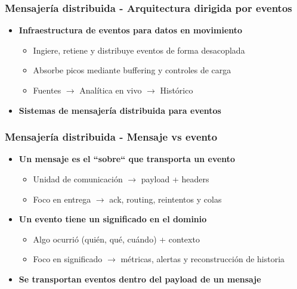 \documentclass[aspectratio=169]{beamer}
\begin{document}
\begin{frame}
\frametitle{Mensajería distribuida - Arquitectura dirigida por eventos}
\begin{itemize}
  \item \textbf{Infraestructura de eventos para datos en movimiento}
  \begin{itemize}
    \item Ingiere, retiene y distribuye eventos de forma desacoplada
    \item Absorbe picos mediante buffering y controles de carga
    \item Fuentes $\rightarrow$ Analítica en vivo $\rightarrow$ Histórico
  \end{itemize}

  \vspace{1em}

  \item \textbf{Sistemas de mensajería distribuida para eventos}
\end{itemize}
\end{frame}


\begin{frame}
\frametitle{Mensajería distribuida - Mensaje vs evento}
\begin{itemize}
  \item \textbf{Un mensaje es el ``sobre`` que transporta un evento}
  \begin{itemize}
    \item Unidad de comunicación $\rightarrow$ payload + headers
    \item Foco en entrega $\rightarrow$ ack, routing, reintentos y colas
  \end{itemize}

  \vspace{1em}

  \item \textbf{Un evento tiene un significado en el dominio}
  \begin{itemize}
    \item Algo ocurrió (quién, qué, cuándo) + contexto
    \item Foco en significado $\rightarrow$ métricas, alertas y reconstrucción de historia
  \end{itemize}

  \vspace{1em}

  \item \textbf{Se transportan eventos dentro del payload de un mensaje}
\end{itemize}
\end{frame}
\end{document}
